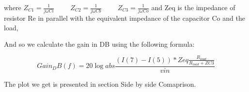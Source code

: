 where $Z_{C1} = \frac{1}{j \omega Ci} \hspace{1cm} Z_{C2} = \frac{1}{j \omega Cb} \hspace{1cm} Z_{C3} = \frac{1}{j \omega Co}$
and Zeq is the impedance of resistor Re in parallel with the equivalent impedance of the capacitor Co and the load,


And so we calculate the gain in DB using the following formula:

\begin{equation}
  Gain_DB(f) =20 \log{abs\frac{(I(7) - I(5)) * Zeq \frac{R_{load}}{R_{load} + ZC3}}{vin}}
\end{equation}

The plot we get is presented in section Side by side Comaprison.






